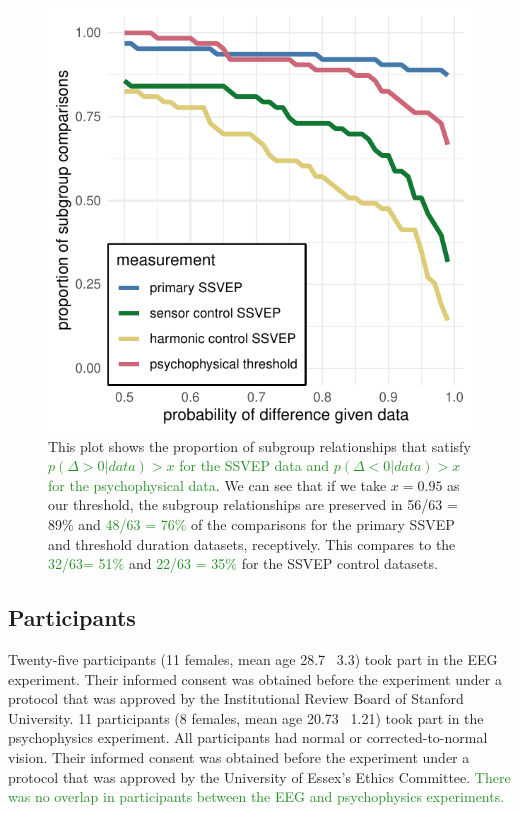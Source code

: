 \documentclass[11pt, twoside]{article}
\begin{document}
\begin{figure}[tbp]
\centering
\includegraphics[width=0.5\linewidth]{../analysis/plots/model_roc_style.pdf}
\caption{This plot shows the proportion of subgroup relationships that satisfy \textcolor{ForestGreen}{$p(\Delta >0 | data) > x$ for the SSVEP data and $p(\Delta <0 | data) > x$ for the psychophysical data}. We can see that if we take $x = 0.95$ as our threshold, the subgroup relationships are preserved in 56/63 = 89\% and \textcolor{ForestGreen}{48/63 = 76\%} of the comparisons for the primary SSVEP and threshold duration datasets, receptively. This compares to the \textcolor{ForestGreen}{32/63= 51\%} and \textcolor{ForestGreen}{22/63 = 35\%} for the SSVEP control datasets.}
\label{fig:roc_style}
\end{figure}

\subsection*{Participants}
Twenty-five participants (11 females, mean age 28.7 \textpm\ 3.3) took part in the EEG experiment. Their informed consent was obtained before the experiment under a protocol that was approved by the Institutional Review Board of Stanford University. 11 participants (8 females, mean age 20.73 \textpm\ 1.21) took part in the psychophysics experiment. All participants had normal or corrected-to-normal vision. Their informed consent was obtained before the experiment under a protocol that was approved by the University of Essex's Ethics Committee. \textcolor{ForestGreen}{There was no overlap in participants between the EEG and psychophysics experiments.}
\end{document}
